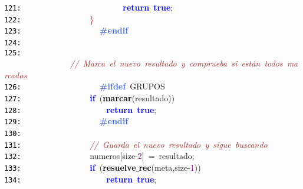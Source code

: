 \documentclass[a4paper,10pt]{scrartcl}
\begin{document}
{   \mbox{}\texttt{\textcolor{Black}{121:}} \ \ \ \ \ \ \ \ \ \ \ \ \ \ \ \ \ \ \ \ \ \ \ \ \textbf{\textcolor{Blue}{return}}\ \textbf{\textcolor{Blue}{true}}\textcolor{BrickRed}{;} \\
   \mbox{}\texttt{\textcolor{Black}{122:}} \ \ \ \ \ \ \ \ \ \ \ \ \ \ \ \ \textcolor{Red}{\}} \\
   \mbox{}\texttt{\textcolor{Black}{123:}} \textbf{\textcolor{RoyalBlue}{\ \ \ \ \ \ \ \ \ \ \ \ \ \ \ \ \#endif}} \\
   \mbox{}\texttt{\textcolor{Black}{124:}} \ \ \ \ \ \ \ \  \\
   \mbox{}\texttt{\textcolor{Black}{125:}} \ \ \ \ \ \ \ \ \ \ \ \ \ \ \ \ \textit{\textcolor{Brown}{//\ Marca\ el\ nuevo\ resultado\ y\ comprueba\ si\ están\ todos\ marcados}} \\
   \mbox{}\texttt{\textcolor{Black}{126:}} \textbf{\textcolor{RoyalBlue}{\ \ \ \ \ \ \ \ \ \ \ \ \ \ \ \ \#ifdef}}\ GRUPOS \\
   \mbox{}\texttt{\textcolor{Black}{127:}} \ \ \ \ \ \ \ \ \ \ \ \ \ \ \ \ \textbf{\textcolor{Blue}{if}}\ \textcolor{BrickRed}{(}\textbf{\textcolor{Black}{marcar}}\textcolor{BrickRed}{(}resultado\textcolor{BrickRed}{))} \\
   \mbox{}\texttt{\textcolor{Black}{128:}} \ \ \ \ \ \ \ \ \ \ \ \ \ \ \ \ \ \ \ \ \textbf{\textcolor{Blue}{return}}\ \textbf{\textcolor{Blue}{true}}\textcolor{BrickRed}{;} \\
   \mbox{}\texttt{\textcolor{Black}{129:}} \textbf{\textcolor{RoyalBlue}{\ \ \ \ \ \ \ \ \ \ \ \ \ \ \ \ \#endif}} \\
   \mbox{}\texttt{\textcolor{Black}{130:}} \ \ \ \ \ \ \ \ \ \ \ \ \ \  \\
   \mbox{}\texttt{\textcolor{Black}{131:}} \ \ \ \ \ \ \ \ \ \ \ \ \ \ \ \ \textit{\textcolor{Brown}{//\ Guarda\ el\ nuevo\ resultado\ y\ sigue\ buscando}} \\
   \mbox{}\texttt{\textcolor{Black}{132:}} \ \ \ \ \ \ \ \ \ \ \ \ \ \ \ \ numeros\textcolor{BrickRed}{[}size\textcolor{BrickRed}{-}\textcolor{Purple}{2}\textcolor{BrickRed}{]}\ \textcolor{BrickRed}{=}\ resultado\textcolor{BrickRed}{;} \\
   \mbox{}\texttt{\textcolor{Black}{133:}} \ \ \ \ \ \ \ \ \ \ \ \ \ \ \ \ \textbf{\textcolor{Blue}{if}}\ \textcolor{BrickRed}{(}\textbf{\textcolor{Black}{resuelve$\_$rec}}\textcolor{BrickRed}{(}meta\textcolor{BrickRed}{,}size\textcolor{BrickRed}{-}\textcolor{Purple}{1}\textcolor{BrickRed}{))} \\
   \mbox{}\texttt{\textcolor{Black}{134:}} \ \ \ \ \ \ \ \ \ \ \ \ \ \ \ \ \ \ \ \ \textbf{\textcolor{Blue}{return}}\ \textbf{\textcolor{Blue}{true}}\textcolor{BrickRed}{;} \\
}
\end{document}
